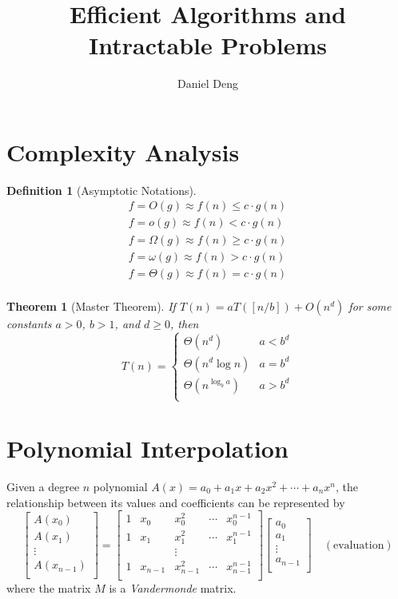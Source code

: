 \documentclass[11pt]{article}
\title{Efficient Algorithms and Intractable Problems}
\author{Daniel Deng}
\date{}
\newtheorem{theorem}{Theorem}[section]
\theoremstyle{definition}
\newtheorem{definition}{Definition}[section]
\theoremstyle{remark}
\begin{document}
\maketitle

\section{Complexity Analysis}

\begin{definition}[Asymptotic Notations]
\begin{align*}
f = O(g) \approx f(n) \leq c\cdot g(n) \\
f = o(g) \approx f(n) < c\cdot g(n) \\
f = \Omega(g) \approx f(n) \geq c\cdot g(n) \\
f = \omega(g) \approx f(n) > c\cdot g(n) \\
f = \Theta(g) \approx f(n) = c\cdot g(n) \\
\end{align*}
\end{definition}

\begin{theorem}[Master Theorem]
If $T(n)=aT([n/b])+O(n^d)$ for some constants $a>0$, $b>1$, and $d\geq 0$, then
\begin{equation*}
T(n)=\begin{cases}
\Theta(n^d) &a<b^d \\
\Theta(n^d \log n) & a = b^d \\
\Theta(n^{\log_b a}) & a > b^d \\
\end{cases}
\end{equation*}
\end{theorem}

\section{Polynomial Interpolation}
Given a degree $n$ polynomial $A(x)=a_0 + a_1 x + a_2 x^2+\cdots + a_{n} x^n$, the relationship between its values and coefficients can be represented by
$$
\begin{bmatrix}
A(x_0) \\ A(x_1) \\ \vdots \\ A(x_{n-1}) \\
\end{bmatrix} = \begin{bmatrix}
1 & x_0 & x_0^2 & \cdots & x_0^{n-1} \\
1 & x_1 & x_1^2 & \cdots & x_1^{n-1} \\
&& \vdots \\
1 & x_{n-1} & x_{n-1}^2 & \cdots & x_{n-1}^{n-1} \\
\end{bmatrix} \begin{bmatrix}
a_0 \\ a_1 \\ \vdots \\ a_{n-1} \\
\end{bmatrix} \quad (\mbox{evaluation})
$$
where the matrix $M$ is a \textit{Vandermonde} matrix.
\end{document}
